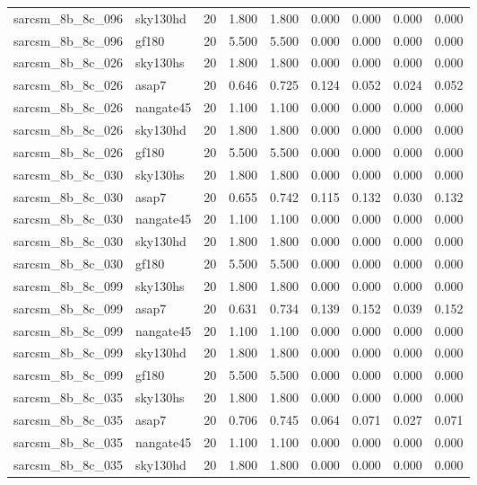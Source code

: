 \begin{tabular}{llrrrrrrr}
sarcsm\_8b\_8c\_096 & sky130hd & 20 & 1.800 & 1.800 & 0.000 & 0.000 & 0.000 & 0.000 \\
sarcsm\_8b\_8c\_096 & gf180 & 20 & 5.500 & 5.500 & 0.000 & 0.000 & 0.000 & 0.000 \\
sarcsm\_8b\_8c\_026 & sky130hs & 20 & 1.800 & 1.800 & 0.000 & 0.000 & 0.000 & 0.000 \\
sarcsm\_8b\_8c\_026 & asap7 & 20 & 0.646 & 0.725 & 0.124 & 0.052 & 0.024 & 0.052 \\
sarcsm\_8b\_8c\_026 & nangate45 & 20 & 1.100 & 1.100 & 0.000 & 0.000 & 0.000 & 0.000 \\
sarcsm\_8b\_8c\_026 & sky130hd & 20 & 1.800 & 1.800 & 0.000 & 0.000 & 0.000 & 0.000 \\
sarcsm\_8b\_8c\_026 & gf180 & 20 & 5.500 & 5.500 & 0.000 & 0.000 & 0.000 & 0.000 \\
sarcsm\_8b\_8c\_030 & sky130hs & 20 & 1.800 & 1.800 & 0.000 & 0.000 & 0.000 & 0.000 \\
sarcsm\_8b\_8c\_030 & asap7 & 20 & 0.655 & 0.742 & 0.115 & 0.132 & 0.030 & 0.132 \\
sarcsm\_8b\_8c\_030 & nangate45 & 20 & 1.100 & 1.100 & 0.000 & 0.000 & 0.000 & 0.000 \\
sarcsm\_8b\_8c\_030 & sky130hd & 20 & 1.800 & 1.800 & 0.000 & 0.000 & 0.000 & 0.000 \\
sarcsm\_8b\_8c\_030 & gf180 & 20 & 5.500 & 5.500 & 0.000 & 0.000 & 0.000 & 0.000 \\
sarcsm\_8b\_8c\_099 & sky130hs & 20 & 1.800 & 1.800 & 0.000 & 0.000 & 0.000 & 0.000 \\
sarcsm\_8b\_8c\_099 & asap7 & 20 & 0.631 & 0.734 & 0.139 & 0.152 & 0.039 & 0.152 \\
sarcsm\_8b\_8c\_099 & nangate45 & 20 & 1.100 & 1.100 & 0.000 & 0.000 & 0.000 & 0.000 \\
sarcsm\_8b\_8c\_099 & sky130hd & 20 & 1.800 & 1.800 & 0.000 & 0.000 & 0.000 & 0.000 \\
sarcsm\_8b\_8c\_099 & gf180 & 20 & 5.500 & 5.500 & 0.000 & 0.000 & 0.000 & 0.000 \\
sarcsm\_8b\_8c\_035 & sky130hs & 20 & 1.800 & 1.800 & 0.000 & 0.000 & 0.000 & 0.000 \\
sarcsm\_8b\_8c\_035 & asap7 & 20 & 0.706 & 0.745 & 0.064 & 0.071 & 0.027 & 0.071 \\
sarcsm\_8b\_8c\_035 & nangate45 & 20 & 1.100 & 1.100 & 0.000 & 0.000 & 0.000 & 0.000 \\
sarcsm\_8b\_8c\_035 & sky130hd & 20 & 1.800 & 1.800 & 0.000 & 0.000 & 0.000 & 0.000 \\

\end{tabular}
